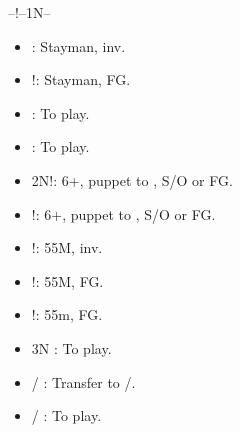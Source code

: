 \documentclass[12pt,twoside,a5paper]{report}%
\begin{document}
	--!--1N--
	\begin{itemize}
	\renewcommand{\labelitemi}{}
	\item {} : Stayman, inv.
	\item {}!: Stayman, FG.
	\item {} : To play.
	\item {} : To play.
	\item 2N!: 6+\cl{}, puppet to , S/O or FG.
	\item {}!: 6+\di{}, puppet to , S/O or FG.
	\item {}!: 55M, inv.
	\item {}!: 55M, FG.
	\item {}!: 55m, FG.
	\item 3N : To play.
	\item {}/ : Transfer to /\sp{}.
	\item {}/ : To play.
	\end{itemize}


\end{document}
